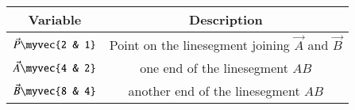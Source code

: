 \begin{tabular}[12pt]{ |c| c|}
    \hline
    \textbf{Variable} & \textbf{Description}\\ 
    \hline
	$\vec{P}\myvec{2 & 1}$ & Point on the linesegment joining $\vec{A}$ and $\vec{B}$ \\
    \hline 
	$\vec{A}\myvec{4 & 2}$ & one end of the linesegment $AB$ \\
    \hline
	$\vec{B}\myvec{8 & 4}$ & another end of the linesegment $AB$\\
    \hline 
    \end{tabular}
